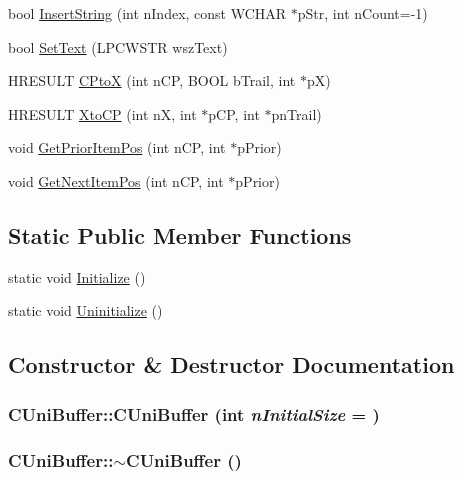 \begin{DoxyCompactItemize}
\item 
bool \hyperlink{class_c_uni_buffer_a7c4687bd6d8d4cafd7842b9097089c8e}{InsertString} (int nIndex, const WCHAR $\ast$pStr, int nCount=-\/1)
\item 
bool \hyperlink{class_c_uni_buffer_a1d0bcdd0278d7d49bfc4dd00898730b2}{SetText} (LPCWSTR wszText)
\item 
HRESULT \hyperlink{class_c_uni_buffer_a9d8522f9cb2fcc14b0e9e43cd4b70f44}{CPtoX} (int nCP, BOOL bTrail, int $\ast$pX)
\item 
HRESULT \hyperlink{class_c_uni_buffer_adea62d3f30ad870b207d8816b0a1ce89}{XtoCP} (int nX, int $\ast$pCP, int $\ast$pnTrail)
\item 
void \hyperlink{class_c_uni_buffer_aef3e042ec363325c37371880c0490aa4}{GetPriorItemPos} (int nCP, int $\ast$pPrior)
\item 
void \hyperlink{class_c_uni_buffer_a925e667b4bdfa744f41d1fc4852d2ab1}{GetNextItemPos} (int nCP, int $\ast$pPrior)
\end{DoxyCompactItemize}
\subsection*{Static Public Member Functions}
\begin{DoxyCompactItemize}
\item 
static void \hyperlink{class_c_uni_buffer_a05f3f1bcd1444d9e5ae974f9d83fe5f8}{Initialize} ()
\item 
static void \hyperlink{class_c_uni_buffer_a6c35e6bd8c80ef44836b228bd07a17c4}{Uninitialize} ()
\end{DoxyCompactItemize}


\subsection{Constructor \& Destructor Documentation}
\hypertarget{class_c_uni_buffer_af89473fb3587314c4b3d773f0ed4fde1}{
\subsubsection[{CUniBuffer}]{\setlength{\rightskip}{0pt plus 5cm}CUniBuffer::CUniBuffer (int {\em nInitialSize} = {})}}
\label{class_c_uni_buffer_af89473fb3587314c4b3d773f0ed4fde1}
\hypertarget{class_c_uni_buffer_ab8612aea115b768b9927239c2e9568d0}{
\subsubsection[{$\sim$CUniBuffer}]{\setlength{\rightskip}{0pt plus 5cm}CUniBuffer::$\sim$CUniBuffer ()}}
\label{class_c_uni_buffer_ab8612aea115b768b9927239c2e9568d0}


